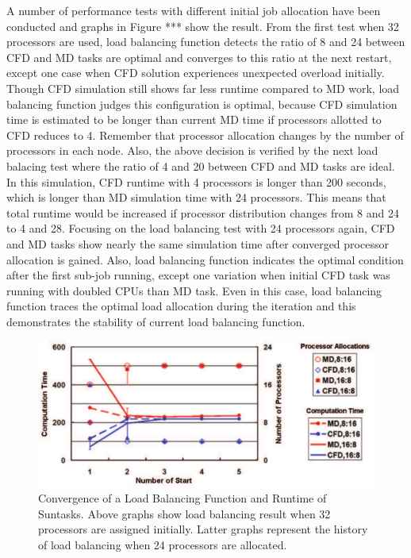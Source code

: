 \documentclass[conference,final]{IEEEtran}
\begin{document}
A number of performance tests with different initial job allocation have been conducted and graphs in Figure *** show the result. From the first test when 32 processors are used, load balancing function detects the ratio of 8 and 24 between CFD and MD tasks are optimal and converges to this ratio at the next restart, except one case when CFD solution experiences unexpected overload initially. Though CFD simulation still shows far less runtime compared to MD work, load balancing function judges this configuration is optimal, because CFD simulation time is estimated to be longer than current MD time if processors allotted to CFD reduces to 4. Remember that processor allocation changes by the number of processors in each node. Also, the above decision is verified by the next load balacing test where the ratio of 4 and 20 between CFD and MD tasks are ideal. In this simulation, CFD runtime with 4 processors is longer than 200 seconds, which is longer than MD simulation time with 24 processors. This means that total runtime would be increased if processor distribution changes from 8 and 24 to 4 and 28. Focusing on the load balancing test with 24 processors again, CFD and MD tasks show nearly the same simulation time after converged processor allocation is gained. Also, load balancing function indicates the optimal condition after the first sub-job running, except one variation when initial CFD task was running with doubled CPUs than MD task. Even in this case, load balancing function traces the optimal load allocation during the iteration and this demonstrates the stability of current load balancing function.

\begin{figure}
\centering
\includegraphics[scale=0.25]{LB_Graph}
\caption{\small Convergence of a Load Balancing Function and Runtime of Suntasks. Above graphs show load balancing result when 32 processors are assigned initially. Latter graphs represent the history of load balancing when 24 processors are allocated.}
\end{figure}
\end{document}
